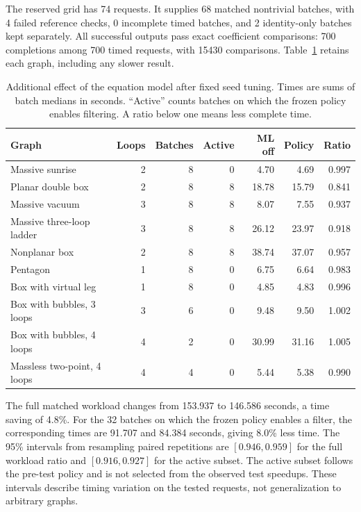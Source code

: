 The reserved grid has 74 requests. It supplies 68 matched nontrivial batches, with 4 failed reference checks, 0 incomplete timed batches, and 2 identity-only batches kept separately. All successful outputs pass exact coefficient comparisons: 700 completions among 700 timed requests, with 15430 comparisons. Table~\ref{tab:equation-refinement} retains each graph, including any slower result.

\begin{table}[!htbp]\centering\small
\caption{Additional effect of the equation model after fixed seed tuning. Times are sums of batch medians in seconds. ``Active'' counts batches on which the frozen policy enables filtering. A ratio below one means less complete time.}
\label{tab:equation-refinement}
\begin{tabular}{@{}lrrrrrr@{}}\toprule
Graph & Loops & Batches & Active & ML off & Policy & Ratio\\\midrule
Massive sunrise & 2 & 8 & 0 & 4.70 & 4.69 & 0.997\\
Planar double box & 2 & 8 & 8 & 18.78 & 15.79 & 0.841\\
Massive vacuum & 3 & 8 & 8 & 8.07 & 7.55 & 0.937\\
Massive three-loop ladder & 3 & 8 & 8 & 26.12 & 23.97 & 0.918\\
Nonplanar box & 2 & 8 & 8 & 38.74 & 37.07 & 0.957\\
Pentagon & 1 & 8 & 0 & 6.75 & 6.64 & 0.983\\
Box with virtual leg & 1 & 8 & 0 & 4.85 & 4.83 & 0.996\\
Box with bubbles, 3 loops & 3 & 6 & 0 & 9.48 & 9.50 & 1.002\\
Box with bubbles, 4 loops & 4 & 2 & 0 & 30.99 & 31.16 & 1.005\\
Massless two-point, 4 loops & 4 & 4 & 0 & 5.44 & 5.38 & 0.990\\
\bottomrule\end{tabular}
\end{table}

The full matched workload changes from 153.937 to 146.586 seconds, a time saving of 4.8\%. For the 32 batches on which the frozen policy enables a filter, the corresponding times are 91.707 and 84.384 seconds, giving 8.0\% less time. The 95\% intervals from resampling paired repetitions are $[0.946, 0.959]$ for the full workload ratio and $[0.916, 0.927]$ for the active subset. The active subset follows the pre-test policy and is not selected from the observed test speedups. These intervals describe timing variation on the tested requests, not generalization to arbitrary graphs.

